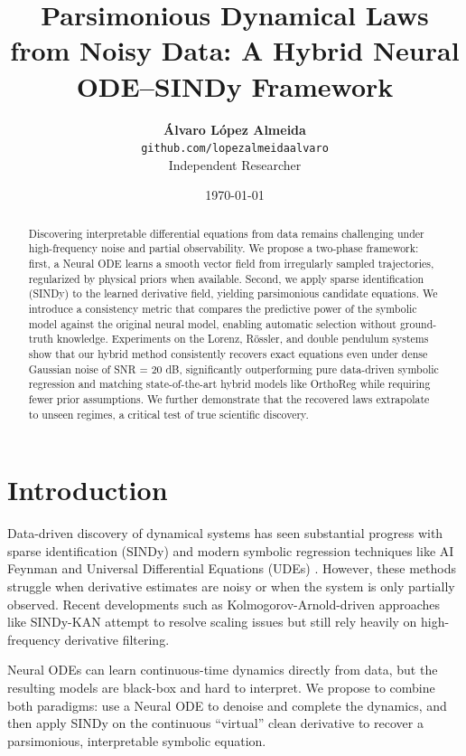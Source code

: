 \documentclass{article}
\title{\textbf{Parsimonious Dynamical Laws from Noisy Data: A Hybrid Neural ODE--SINDy Framework}}
\author{
  \textbf{Álvaro López Almeida} \\
  \small \texttt{github.com/lopezalmeidaalvaro} \\
  \small Independent Researcher
}
\date{\today}
\begin{document}
\maketitle

\begin{abstract}
Discovering interpretable differential equations from data remains challenging under high-frequency noise and partial observability. We propose a two-phase framework: first, a Neural ODE \citep{chen2018neural} learns a smooth vector field from irregularly sampled trajectories, regularized by physical priors when available. Second, we apply sparse identification (SINDy) \citep{brunton2016discovering} to the learned derivative field, yielding parsimonious candidate equations. We introduce a consistency metric that compares the predictive power of the symbolic model against the original neural model, enabling automatic selection without ground-truth knowledge. Experiments on the Lorenz, Rössler, and double pendulum systems show that our hybrid method consistently recovers exact equations even under dense Gaussian noise of SNR = 20 dB, significantly outperforming pure data-driven symbolic regression and matching state-of-the-art hybrid models like OrthoReg \citep{thomas2023orthoreg} while requiring fewer prior assumptions. We further demonstrate that the recovered laws extrapolate to unseen regimes, a critical test of true scientific discovery.
\end{abstract}

\section{Introduction}
\label{sec:intro}
Data-driven discovery of dynamical systems has seen substantial progress with sparse identification (SINDy) and modern symbolic regression techniques like AI Feynman \citep{udrescu2020ai} and Universal Differential Equations (UDEs) \citep{rackauckas2020universal}. However, these methods struggle when derivative estimates are noisy or when the system is only partially observed. Recent developments such as Kolmogorov-Arnold-driven approaches like SINDy-KAN \citep{li2024sindykan} attempt to resolve scaling issues but still rely heavily on high-frequency derivative filtering.

Neural ODEs \citep{chen2018neural} can learn continuous-time dynamics directly from data, but the resulting models are black-box and hard to interpret. We propose to combine both paradigms: use a Neural ODE to denoise and complete the dynamics, and then apply SINDy on the continuous ``virtual'' clean derivative to recover a parsimonious, interpretable symbolic equation.
\end{document}
